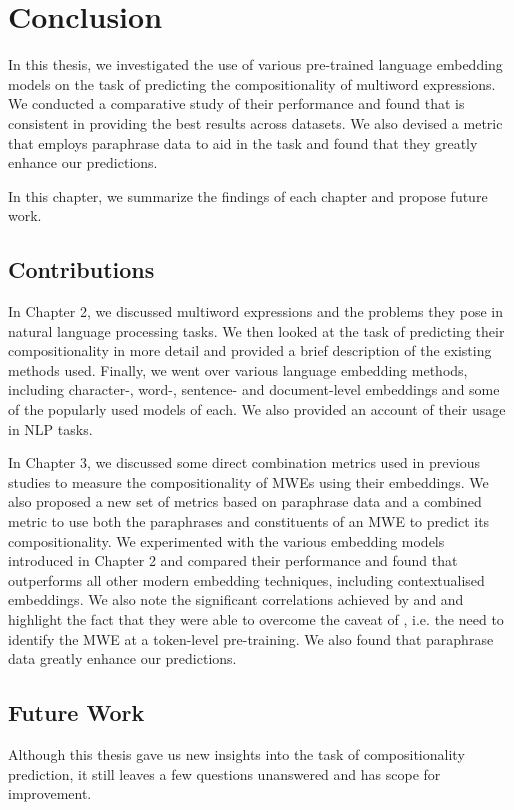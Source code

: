 \chapter{Conclusion}
In this thesis, we investigated the use of various pre-trained language embedding models on the task of predicting the compositionality of multiword expressions. We conducted a comparative study of their performance and found that \wordtovec is consistent in providing the best results across datasets. We also devised a metric that employs paraphrase data to aid in the task and found that they greatly enhance our predictions.

\noindent
In this chapter, we summarize the findings of each chapter and propose future work.

\section{Contributions}
In Chapter 2, we discussed multiword expressions and the problems they pose in natural language processing tasks. We then looked at the task of predicting their compositionality in more detail and provided a brief description of the existing methods used. Finally, we went over various language embedding methods, including character-, word-, sentence- and document-level embeddings and some of the popularly used models of each. We also provided an account of their usage in NLP tasks.

In Chapter 3, we discussed some direct combination metrics used in previous studies to measure the compositionality of MWEs using their embeddings. We also proposed a new set of metrics based on paraphrase data and a combined metric to use both the paraphrases and constituents of an MWE to predict its compositionality. We experimented with the various embedding models introduced in Chapter 2 and compared their performance and found that \wordtovec outperforms all other modern embedding techniques, including contextualised embeddings. We also note the significant correlations achieved by \fasttext and \infersent and highlight the fact that they were able to overcome the caveat of \wordtovec, i.e. the need to identify the MWE at a token-level pre-training. We also found that paraphrase data greatly enhance our predictions.

\section{Future Work}
Although this thesis gave us new insights into the task of compositionality prediction, it still leaves a few questions unanswered and has scope for improvement.

